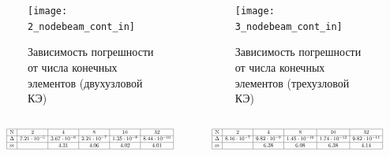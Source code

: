 \documentclass[7pt]{beamer}
\numberwithin{equation}{section}
\newcommand*{\Scale}[2][4]{\scalebox{#1}{$#2$}}
\begin{document}
\begin{frame}{}
	\begin{columns}
		\begin{column}{0.57\textwidth}
			\begin{figure}[H]
				\centering
				\texttt{[image: 2\_nodebeam\_cont\_in]}
				\caption{Зависимость погрешности от числа конечных элементов (двухузловой КЭ)}
				\label{fig:2_nodebeam_cont_in}
			\end{figure}
		\end{column}
		\begin{column}{0.57\textwidth}
			\begin{figure}[H]
				\centering
				\texttt{[image: 3\_nodebeam\_cont\_in]}
				\caption{Зависимость погрешности от числа конечных элементов (трехузловой КЭ)}
				\label{fig:3_nodebeam_cont_in}
			\end{figure}
		\end{column}
	\end{columns}
	\begin{columns}
		\begin{column}{0.5\textwidth}
			\[
				\Scale[0.5] {
						\begin{array}{|c|c|c|c|c|c|}
								\hline
								\text{N} & 2 & 4 & 8 & 16 & 32 \\ \hline
								\Delta  & 7.21 \cdot 10^{-5} & 3.67 \cdot 10^{-6} & 2.21 \cdot 10^{-7} & 1.35 \cdot 10^{-8} & 8.44 \cdot 10^{-10}\\ \hline
								m  &  & 4.31 & 4.06 & 4.02 & 4.01 \\ 
								\hline
						\end{array}
				}
			\]
		\end{column}
		\begin{column}{0.5\textwidth}
			\[
				\Scale[0.5] {
					\begin{array}{|c|c|c|c|c|c|}
						\hline
						\text{N} & 2 & 4 & 8 & 16 & 32\\ \hline
						\Delta  & 8.16 \cdot 10^{-7} & 9.82 \cdot 10^{-9} & 1.45 \cdot 10^{-10} & 1.74 \cdot 10^{-12} & 9.82 \cdot 10^{-14}\\ \hline
						m &  & 6.38 & 6.08 & 6.38 & 4.14 \\ 
						\hline
					\end{array}
				}
			\]
		\end{column}
	\end{columns}
\end{frame}
\end{document}
